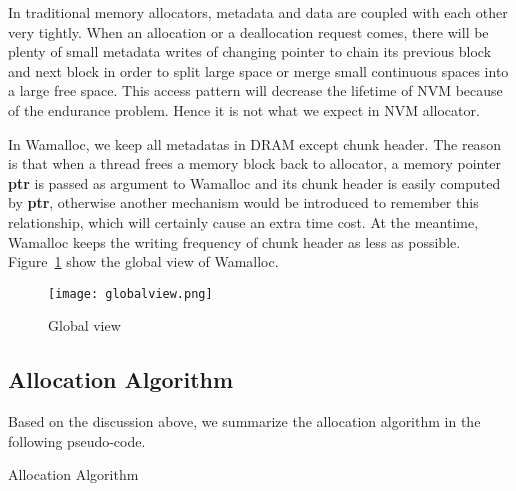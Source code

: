 \documentclass{vldb}
\begin{document}
In traditional memory allocators, metadata and data are coupled with each other very tightly.
When an allocation or a deallocation request comes, there will be plenty of small metadata writes of changing pointer to chain its previous block and next block in order to split large space or merge small continuous spaces into a large free space.
This access pattern will decrease the lifetime of NVM because of the endurance problem.
Hence it is not what we expect in NVM allocator.

In Wamalloc, we keep all metadatas in DRAM except chunk header. 
The reason is that when a thread frees a memory block back to allocator, a memory pointer \textbf{ptr} is passed as argument to Wamalloc and its chunk header is easily computed by \textbf{ptr},
otherwise another mechanism would be introduced to remember this relationship, which will certainly cause an extra time cost.
At the meantime, Wamalloc keeps the writing frequency of chunk header as less as possible. Figure~\ref{fig:globalview} show the global view of Wamalloc.
\begin{figure}[ht!]
\centering
\texttt{[image: globalview.png]}
\caption{Global view}
\label{fig:globalview}
\end{figure}

\subsection{Allocation Algorithm}

Based on the discussion above, we summarize the allocation algorithm in the following pseudo-code.

\begin{algorithm}
\caption{Allocation Algorithm}\label{euclid}
\end{algorithm}
\end{document}

